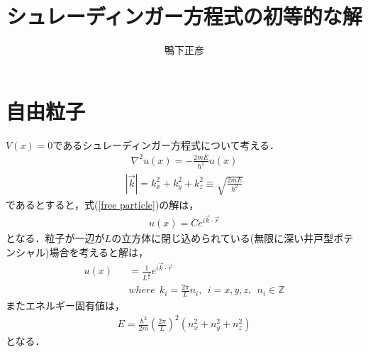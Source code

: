 \documentclass[12pt]{jsarticle}
\numberwithin{equation}{section}
\begin{document}
\title{シュレーディンガー方程式の初等的な解}
\author{鴨下正彦}
\date{}
\maketitle
\section{自由粒子}
$V(x)=0$であるシュレーディンガー方程式について考える．
\begin{eqnarray}\label{free particle}
	\nabla^2 u(x) = - \frac{2mE}{\hbar^2} u(x)
\end{eqnarray}
\begin{eqnarray}
	\left|\vec k\right| = k_x^2 + k_y^2 + k_z^2 \equiv \sqrt{\frac{2mE}{\hbar^2}} 
\end{eqnarray}
であるとすると，式(\ref{free particle})の解は，
\begin{eqnarray}\label{solution free}
	u(x) = C e^{i\vec k \cdot \vec r}
\end{eqnarray}
となる．粒子が一辺が$L$の立方体に閉じ込められている(無限に深い井戸型ポテンシャル)場合を考えると解は，
\begin{eqnarray}
	u(x) &&= \frac{1}{L^{\frac{3}{2}}} e^{i\vec k \cdot \vec r} \\
	&& where ~~ k_i = \frac{2\pi}{L} n_i, ~~ i = x,y,z, ~~ n_i \in \mathbb{Z} \nonumber
\end{eqnarray}
またエネルギー固有値は，
\begin{eqnarray}
	E = \frac{\hbar^2}{2m} \left(\frac{2\pi}{L}\right)^2 (n_x^2 + n_y^2 + n_z^2) 
\end{eqnarray}
となる．
\end{document}
